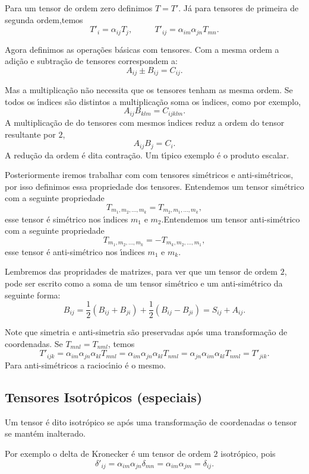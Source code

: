 Para um tensor de ordem zero definimos $T=T'$. J\'a para tensores
de primeira de segunda ordem,temos
\[T'_{i}=\alpha_{ij}T_{j},\mbox{   }\mbox{   }\mbox{   }\mbox{   }
T'_{ij}=\alpha_{im}\alpha_{jn}T_{mn}.\]



Agora definimos as opera\c{c}\~oes b\'asicas com tensores.
Com a mesma ordem a adi\c{c}\~ao e subtra\c{c}\~ao de tensores
correspondem a:
\[A_{ij} \pm B_{ij}=C_{ij}.\]

Mas a multiplica\c{c}\~ao n\~ao necessita que os tensores tenham as
mesma ordem. Se todos os \'\i ndices s\~ao distintos a
multiplica\c{c}\~ao soma os \'\i ndices, como por exemplo,
\[A_{ij}B_{klm}=C_{ijklm}.\]
A multiplica\c{c}\~ao de do tensores com mesmos \'\i ndices reduz
a ordem do tensor resultante por $2$,
\[A_{ij}B_{j}=C_{i}.\]
A redu\c{c}\~ao da ordem \'e dita contra\c{c}\~ao. Um t\'\i pico
exemplo \'e o produto escalar.

Posteriormente iremos trabalhar com com tensores sim\'etricos e
anti-sim\'etricos, por isso definimos essa propriedade dos
tensores. Entendemos um  tensor sim\'etrico com a seguinte
propriedade
\[T_{m_{1},m_{2},...,m_{k}}=T_{m_{2},m_{1},...,m_{k}},\]
esse tensor \'e sim\'etrico nos \'\i ndices $m_{1}$ e
$m_{2}$.Entendemos um  tensor anti-sim\'etrico com a seguinte
propriedade
\[T_{m_{1},m_{2},...,m_{k}}=-T_{m_{k},m_{2},...,m_{1}},\]
esse tensor \'e anti-sim\'etrico nos \'\i ndices $m_{1}$ e $m_{k}$.

Lembremos das propridades de matrizes, para ver que um tensor de
ordem $2$, pode ser escrito como a soma de um tensor sim\'etrico e
um anti-sim\'etrico da seguinte forma:
\[B_{ij}=\frac{1}{2}(B_{ij}+B_{ji})+\frac{1}{2}(B_{ij}-B_{ji})=S_{ij}+A_{ij}.\]

Note que simetria e anti-simetria s\~ao preservadas ap\'os uma
transforma\c{c}\~ao de coordenadas.
 Se $T_{mnl}=T_{nml}$, temos
\[T'_{ijk}=\alpha_{im}\alpha_{jn}\alpha_{kl}T_{mnl}=\alpha_{im}\alpha_{jn}\alpha_{kl}T_{nml}=
\alpha_{jn}\alpha_{im}\alpha_{kl}T_{nml}=T'_{jik}.\] Para
anti-sim\'etricos a racioc\'\i nio \'e o mesmo.

\subsection{Tensores Isotr\'opicos (especiais)}


Um tensor \'e dito isotr\'opico se ap\'os uma transforma\c{c}\~ao
de coordenadas o tensor se mant\'em inalterado.

Por exemplo o delta de Kronecker \'e um tensor de ordem $2$
isotr\'opico, pois
\[\delta'_{ij}=\alpha_{im}\alpha_{jn}\delta_{mn}=\alpha_{im}\alpha_{jm}=\delta_{ij}.\]


